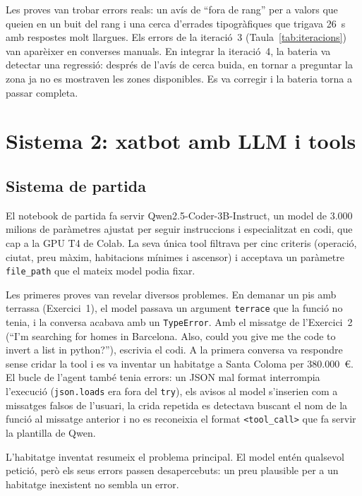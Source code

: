 \documentclass[10pt,a4paper]{article}
\begin{document}
Les proves van trobar errors reals: un avís de ``fora de rang'' per a valors que queien en un buit del rang i una cerca d'errades tipogràfiques que trigava 26~s amb respostes molt llargues. Els errors de la iteració~3 (Taula~\ref{tab:iteracions}) van aparèixer en converses manuals. En integrar la iteració~4, la bateria va detectar una regressió: després de l'avís de cerca buida, en tornar a preguntar la zona ja no es mostraven les zones disponibles. Es va corregir i la bateria torna a passar completa.

\section{Sistema 2: xatbot amb LLM i tools}

\subsection{Sistema de partida}

El notebook de partida fa servir Qwen2.5-Coder-3B-Instruct, un model de 3.000 milions de paràmetres ajustat per seguir instruccions i especialitzat en codi, que cap a la GPU T4 de Colab. La seva única tool filtrava per cinc criteris (operació, ciutat, preu màxim, habitacions mínimes i ascensor) i acceptava un paràmetre \texttt{file\_path} que el mateix model podia fixar.

Les primeres proves van revelar diversos problemes. En demanar un pis amb terrassa (Exercici~1), el model passava un argument \texttt{terrace} que la funció no tenia, i la conversa acabava amb un \texttt{TypeError}. Amb el missatge de l'Exercici~2 (``I'm searching for homes in Barcelona. Also, could you give me the code to invert a list in python?''), escrivia el codi. A la primera conversa va respondre sense cridar la tool i es va inventar un habitatge a Santa Coloma per 380.000~€. El bucle de l'agent també tenia errors: un JSON mal format interrompia l'execució (\texttt{json.loads} era fora del \texttt{try}), els avisos al model s'inserien com a missatges falsos de l'usuari, la crida repetida es detectava buscant el nom de la funció al missatge anterior i no es reconeixia el format \texttt{<tool\_call>} que fa servir la plantilla de Qwen.

L'habitatge inventat resumeix el problema principal. El model entén qualsevol petició, però els seus errors passen desapercebuts: un preu plausible per a un habitatge inexistent no sembla un error.
\end{document}
